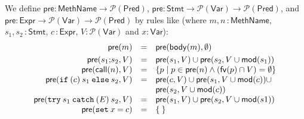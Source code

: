 \begin{definition}
We define
\(\mathsf{pre} \colon \mathsf{MethName} \rightarrow
\mathcal{P}(\mathsf{Pred})\),
\( \mathsf{pre}  \colon  \mathsf{Stmt} \rightarrow
\mathcal{P}(\mathsf{Var}) \rightarrow \mathcal{P}(\mathsf{Pred}) \), and
\( \mathsf{pre}  \colon  \mathsf{Expr} \rightarrow
\mathcal{P}(\mathsf{Var}) \rightarrow \mathcal{P}(\mathsf{Pred}) \)
by rules like (where \(m,n\,\colon\mathsf{MethName}\),
\(s_1,s_2\,\colon\mathsf{Stmt}\), \(c\,\colon\mathsf{Expr}\),
\(V\colon\mathcal{P}(\mathsf{Var})\) and \(x\colon\mathsf{Var}\)): 
\[
\begin{array}{rcl}
\mathsf{pre}(m) & = & \mathsf{pre}(\mathsf{body}(m), \emptyset) \smallskip\\
\mathsf{pre}(s_1 \mathtt{;} s_2, V) & = & \mathsf{pre}(s_1, V) \cup 
                                          \mathsf{pre}(s_2, V \cup \mathsf{mod}(s_1))\\

\mathsf{pre}(\mathsf{call}(n),V) & = & 
                \{ p \mid p \in \mathsf{pre}(n) \wedge 
                          (\mathsf{fv}(p) \cap V) = \emptyset\}\\
\mathsf{pre}(\mathtt{if\:(} c \mathtt{)\:} s_1 \mathtt{\:else\:} s_2, V) & = &
   \mathsf{pre}(c, V) \cup 
   \mathsf{pre}(s_1, V \cup \mathsf{mod}(c)) \cup\\
&&   \mathsf{pre}(s_2, V \cup \mathsf{mod}(c))\\
\mathsf{pre}(\mathtt{try\:} s_1 \mathtt{\:catch\:(} E \mathtt{)\:} s_2, V) & = & 
   \mathsf{pre}(s_1, V) \cup 
   \mathsf{pre}(s_2, V \cup \mathsf{mod}(s1))\\
\mathsf{pre}( \mathtt{set\:} x \mathtt{\:=\:} c) & = & \{\: \}
\end{array}
\]
\end{definition}

